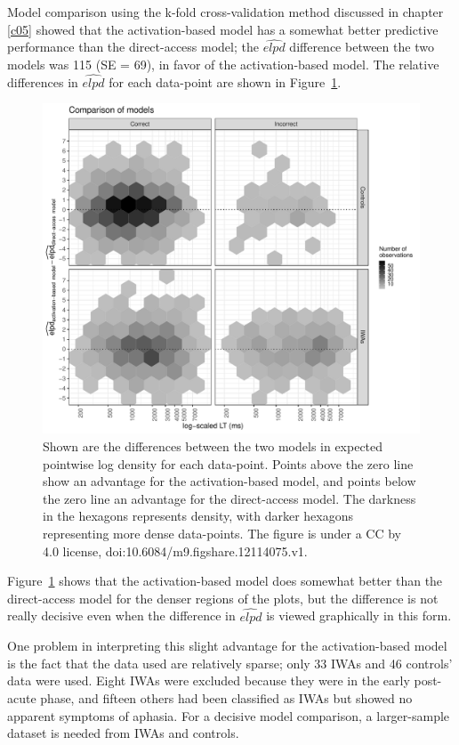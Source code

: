 \documentclass{cambridge7A}\usepackage[]{graphicx}\usepackage[]{color}
\begin{document}
Model comparison using the k-fold cross-validation method discussed  in chapter \ref{c05} showed that the activation-based model has a somewhat better predictive  performance  than the direct-access model; the $\widehat{elpd}$ difference between the two models was 115 (SE = 69), in  favor of the activation-based model. The relative differences in $\widehat{elpd}$ for each data-point are shown in Figure~\ref{fig:paulaplot}. 

\begin{figure}[!htbp]
\centering
\includegraphics[width=\textwidth]{figures/paulaelpdplot}
\caption{Shown are the differences between the two models in expected pointwise log density for each data-point. Points above the zero line  show an advantage for the activation-based model, and points below the zero line an advantage for the direct-access model. The darkness in the hexagons represents density, with darker hexagons representing more dense data-points. The figure is under a CC by 4.0 license, doi:10.6084/m9.figshare.12114075.v1.}\label{fig:paulaplot}
\end{figure}

Figure~\ref{fig:paulaplot} shows that the activation-based model does somewhat better than the direct-access model for the denser regions of the plots, but the difference is not really decisive even when the difference in $\widehat{elpd}$ is viewed graphically in this form.

One problem in interpreting this slight advantage for the activation-based model is the fact that the data used are relatively sparse; only 33 IWAs and 46 controls' data were used. Eight IWAs were excluded because they were in the early post-acute phase, and fifteen others had been classified as IWAs but showed no apparent symptoms of aphasia. For a decisive model comparison, a larger-sample dataset is needed from IWAs and controls.
\end{document}
